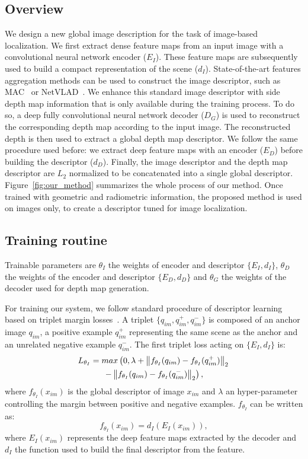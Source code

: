 \subsection{Overview}
\label{subsec:overview}
We design a new global image description for the task of image-based localization. We first extract dense feature maps from an input image with a convolutional neural network encoder ($E_I$). These feature maps are subsequently used to build a compact representation of the scene ($d_I$). State-of-the-art features aggregation methods can be used to construct the image descriptor, such as MAC~\cite{Radenovic2017} or NetVLAD~\cite{Arandjelovic2017}. We enhance this standard image descriptor with side depth map information that is only available during the training process. To do so, a deep fully convolutional neural network decoder ($D_G$) is used to reconstruct the corresponding depth map according to the input image. The reconstructed depth is then used to extract a global depth map descriptor. We follow the same procedure used before: we extract deep feature maps with an encoder ($E_D$) before building the descriptor ($d_D$). Finally, the image descriptor and the depth map descriptor are $L_2$ normalized to be concatenated into a single global descriptor. Figure~\ref{fig:our_method} summarizes the whole process of our method. Once trained with geometric and radiometric information, the proposed method is used on images only, to create a descriptor tuned for image localization.

\subsection{Training routine}
\label{subsec:training}
Trainable parameters are $\theta_{I}$ the weights of encoder and descriptor $\{E_I, d_I\}$, $\theta_{D}$ the weights of the encoder and descriptor $\{E_D, d_D\}$ and $\theta_{G}$ the weights of the decoder used for depth map generation. 

For training our system, we follow standard procedure of descriptor learning based on triplet margin losses~\cite{Arandjelovic2017}. A triplet $\{q_{im}, q_{im}^+, q_{im}^-\}$ is composed of an anchor image $q_{im}$, a positive example $q_{im}^+$ representing the same scene as the anchor and an unrelated negative example $q_{im}^-$.
The first triplet loss acting on $\{E_I, d_I\}$ is:
\begin{multline}
	\label{eq:triplet_loss}
	L_{\theta_{I}} = max\left(0, \lambda + \left\lVert f_{\theta_{I}}(q_{im}) - f_{\theta_{I}}(q_{im}^+)\right\rVert_2  \right. \\	
	\left. - \left\lVert f_{\theta_{I}}(q_{im}) - f_{\theta_{I}}(q_{im}^-)\right\rVert_2 \right),
\end{multline}
where $f_{\theta_{I}}(x_{im})$ is the global descriptor of image $x_{im}$ and $\lambda$ an hyper-parameter controlling the margin between positive and negative examples. $f_{\theta_{I}}$ can be written as:
\begin{equation}
	\label{eq:desc_details}
	f_{\theta_{I}}(x_{im}) = d_I(E_I(x_{im})),
\end{equation}
where $E_I(x_{im})$ represents the deep feature maps extracted by the decoder and $d_I$ the function used to build the final descriptor from the feature.

